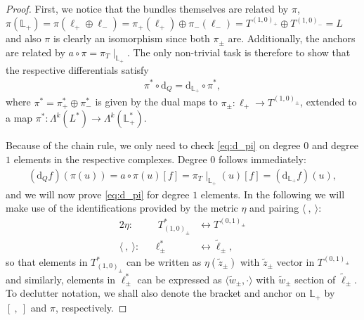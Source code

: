 \documentclass{article}
\newcommand{\rd}{\mathrm{d}}
\newcommand{\Lb}{\mathbb{L}}
\newcommand{\ellt}{{\tl{\ell}}}
\newcommand{\la}{\langle}
\newcommand{\ra}{\rangle}
\newcommand{\lara}{\la\ ,\ \ra}
\newcommand{\brac}{[\ ,\ ]}
\def\tl{\tilde}
\theoremstyle{definition}
\theoremstyle{remark}
\begin{document}
\begin{proof}
First, we notice that the bundles themselves are related by $\pi$,  $\pi(\Lb_+)=\pi(\ell_+\oplus \ell_-)=\pi_+(\ell_+)\oplus \pi_-(\ell_-)=T^{(1,0)_+}\oplus T^{(1,0)_-}=L$ and also $\pi$ is clearly an isomorphism since both $\pi_\pm$ are. Additionally, the anchors are related by $a\circ\pi=\pi_T\!\!\mid_{\Lb_+}$. The only non-trivial task is therefore to show that the respective differentials satisfy
\begin{align}\label{eq:d_pi}
\pi^*\circ\rd_Q  =\rd_{\Lb_+}\circ \pi^*,
\end{align}
where $\pi^*=\pi^*_+\oplus\pi_-^*$ is given by the dual maps to $\pi_\pm:\ell_+\rightarrow T^{(1,0)_\pm}$, extended to a map $\pi^*:\Lambda^k(L^*)\rightarrow\Lambda^k(\Lb_+^*)$.

Because of the chain rule, we only need to check \eqref{eq:d_pi} on degree $0$ and degree $1$ elements in the respective complexes. Degree $0$ follows immediately:
\begin{align*}
(\rd_Q f)(\pi(u))= a\circ \pi(u)[f]=\pi_T\!\!\mid_{\Lb_+}(u)[f]=(\rd_{\Lb_+}f)(u),
\end{align*}
and we will now prove \ref{eq:d_pi} for degree $1$ elements. In the following we will make use of the identifications provided by the metric $\eta$ and pairing $\lara$:
\begin{alignat*}{2}
\eta:&&\  T^*_{(1,0)_\pm} &\leftrightarrow T^{(0,1)_\pm}\\
\lara:&& \ell^*_\pm &\leftrightarrow \ellt_\pm,
\end{alignat*}
so that elements in $T^*_{(1,0)_\pm}$ can be written as $\eta(\tl{z}_\pm)$ with $\tl{z}_\pm$ vector in $T^{(0,1)_\pm}$ and similarly, elements in $\ell^*_\pm$ can be expressed as $\la \tl{w}_\pm, \cdot\ra$ with $\tl{w}_\pm$ section of $\ellt_\pm$. To declutter notation, we shall also denote the bracket and anchor on $\Lb_+$ by $\brac$ and $\pi$, respectively.


\end{proof}
\end{document}

